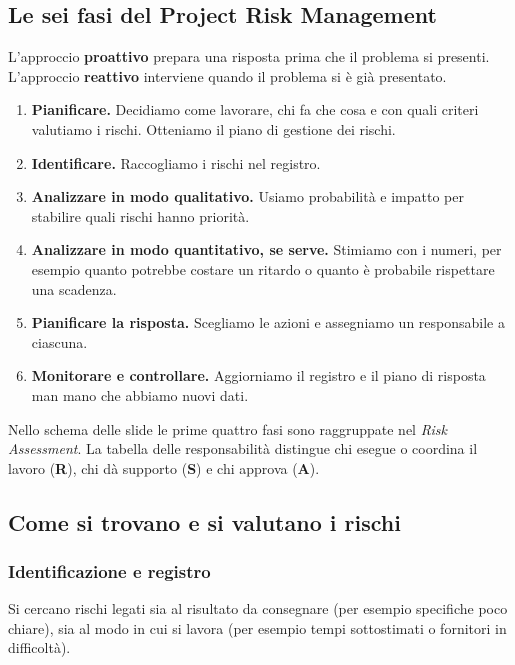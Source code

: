 \subsection*{Le sei fasi del Project Risk Management}

\noindent L'approccio \textbf{proattivo} prepara una risposta prima
che il problema si presenti. L'approccio \textbf{reattivo} interviene
quando il problema si è già presentato.

\begin{enumerate}
    \item \textbf{Pianificare.} Decidiamo come lavorare, chi fa che cosa
        e con quali criteri valutiamo i rischi. Otteniamo il piano di
        gestione dei rischi.
    \item \textbf{Identificare.} Raccogliamo i rischi nel registro.
    \item \textbf{Analizzare in modo qualitativo.} Usiamo probabilità
        e impatto per stabilire quali rischi hanno priorità.
    \item \textbf{Analizzare in modo quantitativo, se serve.}
        Stimiamo con i numeri, per esempio quanto potrebbe costare
        un ritardo o quanto è probabile rispettare una scadenza.
    \item \textbf{Pianificare la risposta.} Scegliamo le azioni e
        assegniamo un responsabile a ciascuna.
    \item \textbf{Monitorare e controllare.} Aggiorniamo il registro
        e il piano di risposta man mano che abbiamo nuovi dati.
\end{enumerate}

\noindent Nello schema delle slide le prime quattro fasi sono
raggruppate nel \emph{Risk Assessment}. La tabella delle responsabilità
distingue chi esegue o coordina il lavoro (\textbf{R}), chi dà supporto
(\textbf{S}) e chi approva (\textbf{A}).

\subsection*{Come si trovano e si valutano i rischi}

\subsubsection*{Identificazione e registro}

\noindent Si cercano rischi legati sia al risultato da consegnare
(per esempio specifiche poco chiare), sia al modo in cui si lavora
(per esempio tempi sottostimati o fornitori in difficoltà).

